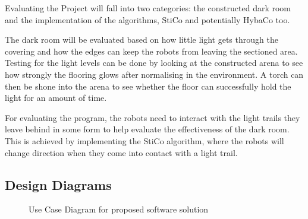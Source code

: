 \label{desSysEval}
Evaluating the Project will fall into two categories:  the constructed dark
room and the implementation of the algorithms, StiCo and potentially HybaCo
too.

The dark room will be evaluated based on how little light gets through the
covering and how the edges can keep the robots from leaving the sectioned area.
Testing for the light levels can be done by looking at the constructed arena to
see how strongly the flooring glows after normalising in the environment.  A 
torch can then be shone into the arena to see whether the floor can successfully
hold the light for an amount of time.

For evaluating the program, the robots need to interact with the light trails
they leave behind in some form to help evaluate the effectiveness of the dark 
room.  This is achieved by implementing the StiCo algorithm, where the robots
will change direction when they come into contact with a light trail.

\clearpage

\subsection{Design Diagrams} \label{desSysDiag}
\begin{figure}[h!] \label{desSysUse}
  \caption{Use Case Diagram for proposed software solution}
  \label{desSysUse}
\end{figure}

